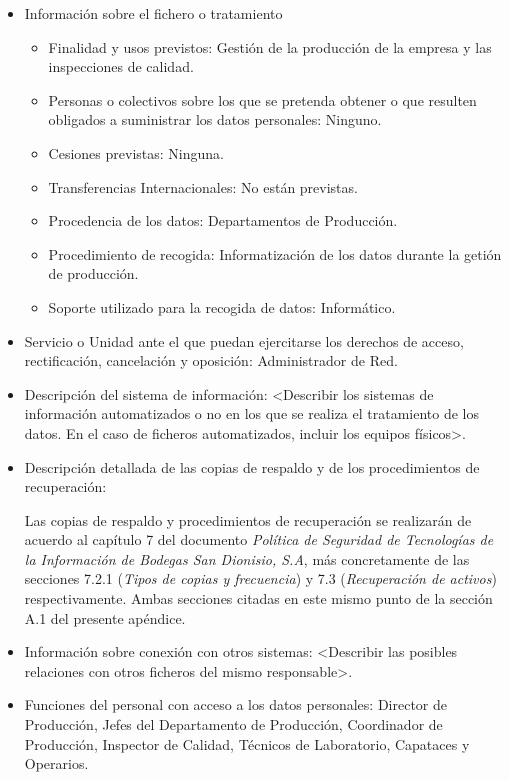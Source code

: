 \documentclass[a4paper,11pt,bibtotoc,noliststotoc]{scrbook}
\begin{document}
\begin{itemize}
\item Información sobre el fichero o tratamiento
	\begin{itemize}
	\item Finalidad y usos previstos: Gestión de la producción de la empresa y las inspecciones de calidad.
	\item Personas o colectivos sobre los que se pretenda obtener o que resulten obligados a suministrar los datos personales: Ninguno.
	\item Cesiones previstas: Ninguna.
	\item Transferencias Internacionales: No están previstas.
	\item Procedencia de los datos: Departamentos de Producción.
	\item Procedimiento de recogida: Informatización de los datos durante la getión de producción.
	\item Soporte utilizado para la recogida de datos: Informático.
	\end{itemize}

\item Servicio o Unidad ante el que puedan ejercitarse los derechos de acceso, rectificación, cancelación y oposición: Administrador de Red.

\item Descripción del sistema de información: <Describir los sistemas de información automatizados o no en los que se realiza el tratamiento de los datos. En el caso de ficheros automatizados, incluir los equipos físicos>.

\item Descripción detallada de las copias de respaldo y de los procedimientos de recuperación:

Las copias de respaldo y procedimientos de recuperación se realizarán de acuerdo al capítulo 7 del documento \emph{Política de Seguridad de Tecnologías de la Información de Bodegas San Dionisio, S.A}, más concretamente de las secciones 7.2.1 (\emph{Tipos de copias y frecuencia}) y 7.3 (\emph{Recuperación de activos}) respectivamente. Ambas secciones citadas en este mismo punto de la sección A.1 del presente apéndice.

\item Información sobre conexión con otros sistemas: <Describir las posibles relaciones con otros ficheros del mismo responsable>.

\item Funciones del personal con acceso a los datos personales: Director de Producción, Jefes del Departamento de Producción, Coordinador de Producción, Inspector de Calidad, Técnicos de Laboratorio, Capataces y Operarios.


\end{itemize}
\end{document}
